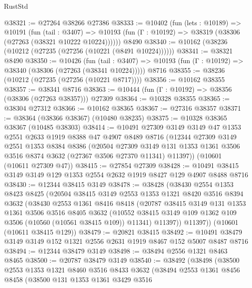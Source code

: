 \begin{lexlean}{RustStd}
\begin{coremodule}
@38321 := @27264 @38266 @27386
@38333 := @10402
    (fun (lets : @10189) =>
    @10191
      (fun (tail : @3407) =>
      @10193 (fun (Γ : @10192) => @38319 (@38306 (@27263 (@38321 @10222 @10224))))))
    @8490
@38340 := @10162 (@38236 (@10212 (@27235 (@27256 (@10221 (@8491 @10224))))))
@38341 := @38321 @8490
@38350 := @10426
    (fun (tail : @3407) => @10193 (fun (Γ : @10192) => @38340 (@38306 (@27263 (@38341 @10224)))))
    @8716
@38355 := @38236 (@10212 (@27235 (@27256 (@10221 @8717))))
@38356 := @10162 @38355
@38357 := @38341 @8716
@38363 := @10444 (fun (Γ : @10192) => @38356 (@38306 (@27263 @38357))) @27309
@38364 := @10328 @38355
@38365 := @38304 @27312
@38366 := @10162 @38365
@38367 := @27316 @38357
@38371 := @38364 (@38366 @38367) (@10480 @38235)
@38375 := @10328 @38365 @38367 (@10485 @38303)
@38414 := @10491
    @27309
    @3149
    @3149
    @47
    @1353
    @2551
    @2633
    @1919
    @8388
    @47
    @4907
    @8489
    @8716
    (@12344
      @27309
      @3149
      @2551
      @1353
      @8384
      @8386
      (@20504
        @27309
        @3149
        @131
        @1353
        @1361
        @3506
        @3516
        @8374
        @3632
        (@27367 @3506 @27370 @11341)
        @11397))
    (@10601 (@10611 @27309 @47))
@38415 := @27854 @27309
@38428 := @10491 @38415 @3149 @3149 @129 @1353 @2554 @2632 @1919 @8427 @129 @4907 @8488 @8716
@38430 := @12344 @38415 @3149
@38478 := @38428
    (@38430
      @2554
      @1353
      @8423
      @8425
      (@20504
        @38415
        @3149
        @2553
        @1353
        @1321
        @8420
        @3516
        @8394
        @3632
        (@38430
          @2553
          @1361
          @8416
          @8418
          (@20787
            @38415
            @3149
            @131
            @1353
            @1361
            @3506
            @3516
            @8405
            @3632
            (@10552 @38415 @3149 @109 @1362 @109 @3506 (@10560 (@10561 @38415 @109)) @11341)
            @11397))
        @11397))
    (@10601 (@10611 @38415 @129))
@38479 := @20821 @38415
@38492 := @10491 @38479 @3149 @3149 @152 @1321 @2556 @2631 @1919 @8467 @152 @5007 @8487 @8716
@38494 := @12344 @38479 @3149
@38498 := @38494 @2556 @1321 @8463 @8465
@38500 := @20787 @38479 @3149
@38540 := @38492
    (@38498
      (@38500
        @2553
        @1353
        @1321
        @8460
        @3516
        @8433
        @3632
        (@38494
          @2553
          @1361
          @8456
          @8458
          (@38500
            @131
            @1353
            @1361
            @3429
            @3516

\end{coremodule}
\end{lexlean}
